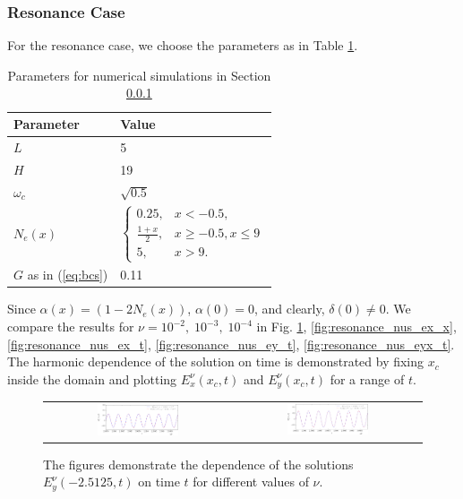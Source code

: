 \subsubsection{Resonance Case}
\label{sec:resn}
For the resonance case, we choose the parameters as in Table \ref{tab:parameters_resonance}.
\begin{table}[htb!]
\begin{tabular}{l|l}
Parameter & Value \\
\hline
$L$ & 5\\
$H$ & 19\\
$\omega_c$ &  $\sqrt{0.5}$\\
$N_e(x)$ &  $\left\{
 \begin{array}{cc}
  0.25, & x<-0.5,\\
  \frac{1+x}{2}, & x\geq -0.5, x\leq 9\\
  5, & x>9.
 \end{array}\right.$\\
 $G$ as in (\ref{eq:bcs}) & 0.11 \\
\end{tabular}
\caption{Parameters for numerical simulations in Section \ref{sec:resn}}
\label{tab:parameters_resonance}
\end{table}
Since $\alpha(x)=(1-2N_e(x))$, $\alpha(0)=0$, and clearly, $\delta(0)\neq 0$. We compare the results for $\nu=10^{-2},\; 10^{-3},\; 10^{-4}$ in Fig. \ref{fig:resonance_nus_ey_x}, 
\ref{fig:resonance_nus_ex_x}, \ref{fig:resonance_nus_ex_t}, \ref{fig:resonance_nus_ey_t}, \ref{fig:resonance_nus_eyx_t}. 
The harmonic dependence of the solution on time is demonstrated by fixing $x_c$ inside the domain and plotting 
$E_x^{\nu}(x_c,t)$ and $E_y^{\nu}(x_c, t)$ for a range of $t$. 
\begin{figure}
\begin{tabular}{cc}
\includegraphics[width=0.45\textwidth]{pics_time_domain/res/ey_fixed_x-crop.pdf}&
\includegraphics[width=0.45\textwidth]{pics_time_domain/res/ey_fixed_x_1e3-crop.pdf}
 \end{tabular}
\caption{The figures demonstrate the dependence of the solutions 
$E_y^{\nu}(-2.5125,t)$ on time $t$ for different values of $\nu$. }
\label{fig:resonance_nus_ey_x}
\end{figure}
